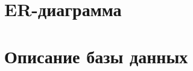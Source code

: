 \documentclass[a4paper,12pt]{article}
\begin{document}


\newpage
\section{ER-диаграмма}
\begin{figure}[h]
\end{figure}
\section{Описание базы данных}
\end{document}
